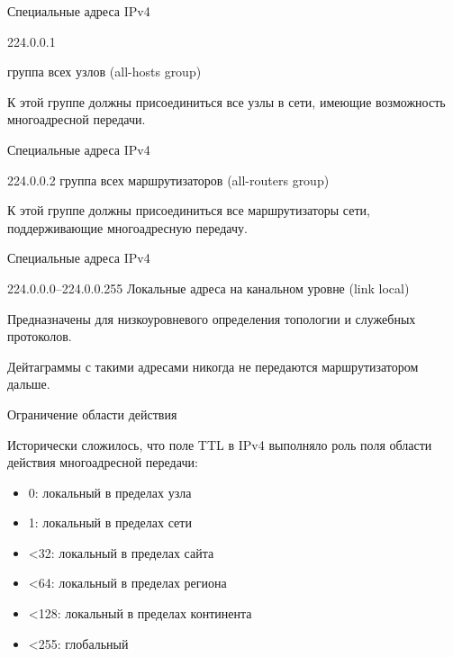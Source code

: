 \begin{frame}{Специальные адреса IPv4}

	\begin{block}{224.0.0.1}

		группа всех узлов (all-hosts group)
	\end{block}

К этой группе должны присоединиться все узлы в сети,  имеющие возможность многоадресной передачи.
\end{frame}

\begin{frame}{Специальные адреса IPv4}

	\begin{block}{224.0.0.2}
		группа всех маршрутизаторов (all-routers group)
	\end{block}

	К этой группе должны присоединиться все маршрутизаторы сети,  поддерживающие многоадресную передачу.
	
\end{frame}

\begin{frame}{Специальные адреса IPv4}

	\begin{block}{224.0.0.0--224.0.0.255}
		Локальные адреса на канальном уровне (link local)
	\end{block}

	Предназначены для низкоуровневого определения топологии и служебных протоколов.
	\bigskip

	Дейтаграммы с такими адресами никогда не передаются маршрутизатором дальше.

\end{frame}


\begin{frame}{Ограничение области действия}

	Исторически сложилось,  что поле TTL в IPv4 выполняло роль поля области действия многоадресной передачи:

	\begin{itemize}
		\item 0: локальный в пределах узла
		\item 1: локальный в пределах сети
		\item \textless 32: локальный в пределах сайта
		\item \textless 64: локальный в пределах региона
		\item \textless 128: локальный в пределах континента
		\item \textless 255: глобальный
	\end{itemize}

\end{frame}

